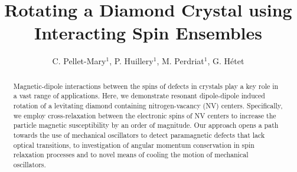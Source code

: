 \documentclass[preprintnumbers,amsmath,amssymb,superscriptaddress,twocolumn,showpacs]{revtex4-1}
\begin{document}
\title{Rotating a Diamond Crystal using Interacting Spin Ensembles}

\author{C. Pellet-Mary$^1$, P. Huillery$^1$, M. Perdriat$^1$, G. H\'etet} 


\begin{abstract}
Magnetic-dipole interactions between the spins of defects in crystals play a key role in a vast range of applications. Here, we demonstrate resonant dipole-dipole induced rotation of a levitating diamond containing nitrogen-vacancy (NV) centers. Specifically, we employ cross-relaxation between the electronic spins of NV centers to increase  
the particle magnetic susceptibility by an order of magnitude.
Our approach opens a path towards the use of mechanical oscillators to detect paramagnetic defects that lack optical transitions, to investigation of angular momentum conservation in spin relaxation processes and to novel means of cooling the motion of mechanical oscillators.
\end{abstract}

\maketitle
\end{document}
